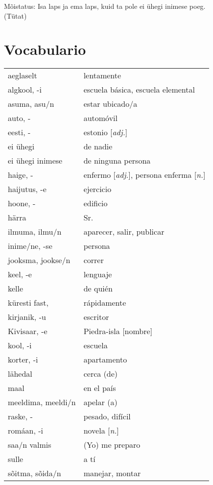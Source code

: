 Mõistatus: Isa laps ja ema laps, kuid ta pole ei ühegi inimese poeg. \\
(Tütat) 

\bigskip
\Large{\section*{Vocabulario}}

\begin{tabular}{ l l }
	aeglaselt			& lentamente \\
	algkool, -i			& escuela básica, escuela elemental \\
	asuma, asu/n		& estar ubicado/a \\
	auto, -				& automóvil \\
	eesti, -			& estonio [\emph{adj.}] \\
	ei ühegi			& de nadie \\
	ei ühegi inimese	& de ninguna persona \\
	haige, -			& enfermo [\emph{adj.}], persona enferma [\emph{n.}] \\
	haijutus, -e		& ejercicio \\
	hoone, -			& edificio \\
	härra				& Sr. \\
	ilmuma, ilmu/n		& aparecer, salir, publicar \\
	inime/ne, -se		& persona \\ 
	jooksma, jookse/n	& correr \\
	keel, -e			& lenguaje \\
	kelle				& de quién \\
	küresti	fast, 		& rápidamente \\
	kirjanik, -u		& escritor \\
	Kivisaar, -e		& Piedra-isla [nombre] \\
	kool, -i			& escuela \\
	korter, -i			& apartamento \\
	lähedal				& cerca (de) \\
	maal				& en el país \\
	meeldima, meeldi/n	& apelar (a) \\
	raske, -			& pesado, difícil \\
	romáan, -i			& novela [\emph{n.}] \\
	saa/n valmis		& (Yo) me preparo \\
	sulle			 	& a tí \\
	sõitma, sõida/n		& manejar, montar \\

\end{tabular}
